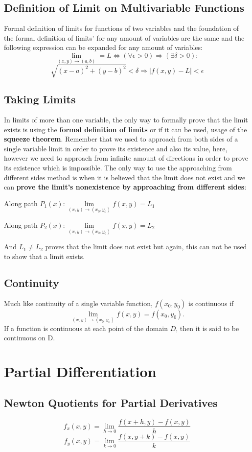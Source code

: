 \documentclass[12pt]{article}
\begin{document}
\subsection{Definition of Limit on Multivariable Functions}
Formal definition of limits for functions of two variables and the foundation of the formal definition of limits' for any amount of variables are the same and the following expression can be expanded for any amount of variables: 
$$\lim \limits_{(x,y)\to (a,b)}=L \Leftrightarrow (\forall \epsilon > 0) \Rightarrow (\exists \delta>0) :$$$$ \sqrt{(x-a)^2+(y-b)^2}<\delta\Rightarrow |f(x,y)-L|<\epsilon$$
\subsection{Taking Limits}
In limits of more than one variable, the only way to formally prove that the limit exists is using the \textbf{formal definition of limits} or if it can be used, usage of the \textbf{squeeze theorem}. Remember that we used to approach from both sides of a single variable limit in order to prove its existence and also its value, here, however we need to approach from infinite amount of directions in order to prove its existence which is impossible. The only way to use the approaching from different sides method is when it is believed that the limit does not exist and we can \textbf{prove the limit's nonexistence by approaching from different sides}:

Along path $P_1(x): \lim \limits_{(x,y) \to (x_0,y_0)}f(x,y)=L_1$

Along path $P_2(x):\lim \limits_{(x,y) \to (x_0,y_0)}f(x,y)=L_2$

And $L_1\neq L_2$ proves that the limit does not exist but again, this can not be used to show that a limit exists.
\subsection{Continuity}
Much like continuity of a single variable function, $f(x_0,y_0)$ is continuous if $$\lim \limits_{(x,y)\to (x_0,y_0)}f(x,y)=f(x_0,y_0).$$ If a function is continuous at each point of the domain $D$, then it is said to be continuous on D.
\section{Partial Differentiation}
\subsection{Newton Quotients for Partial Derivatives}
$$f_x(x,y)=\lim \limits_{h \to 0} \dfrac{f(x+h,y)-f(x,y)}{h}$$
$$f_y(x,y)=\lim \limits_{k \to 0} \dfrac{f(x,y+k)-f(x,y)}{k}$$
\end{document}
